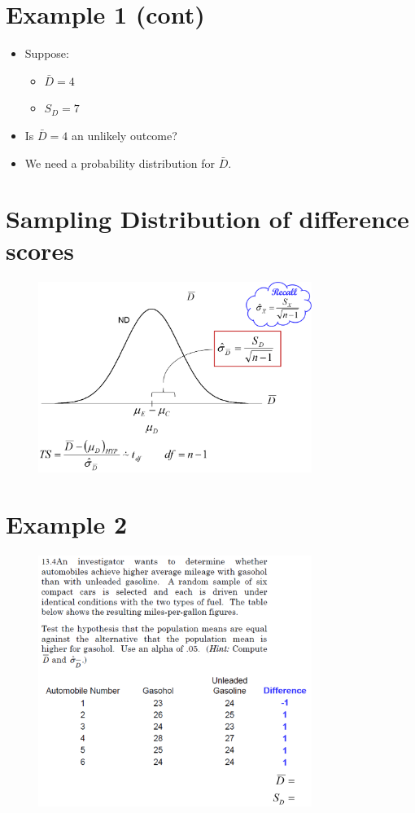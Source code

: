 \documentclass[12pt]{article}
\begin{document}
\section{Example 1 (cont)}\label{example-1-cont}

\begin{itemize}
\itemsep1pt\parskip0pt
\item
  Suppose:

  \begin{itemize}
  \itemsep1pt\parskip0pt
  \item
    \(\bar{D} = 4\)
  \item
    \(S_{D} = 7\)
  \end{itemize}
\item
  Is \(\bar{D} = 4\) an unlikely outcome?
\item
  We need a probability distribution for \(\bar{D}\).
\end{itemize}

\section{Sampling Distribution of difference
scores}\label{sampling-distribution-of-difference-scores}

\begin{figure}[H]
\centering
\includegraphics[width=3.5in]{samp_dist_diff.png}
\caption{}
\end{figure}

\section{Example 2}\label{example-2}

\begin{figure}[H]
\centering
\includegraphics[width=3.5in]{dep_ttest_example2.png}
\caption{}
\end{figure}
\end{document}
